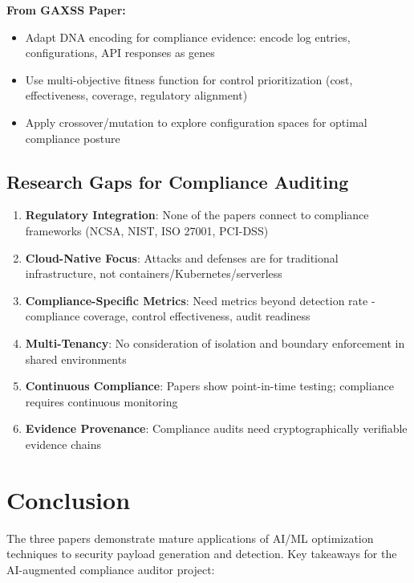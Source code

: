 \documentclass[11pt,conference]{IEEEtran}
\begin{document}
\begin{enumerate}
\textbf{From GAXSS Paper:}
\begin{itemize}
    \item Adapt DNA encoding for compliance evidence: encode log entries, configurations, API responses as genes
    \item Use multi-objective fitness function for control prioritization (cost, effectiveness, coverage, regulatory alignment)
    \item Apply crossover/mutation to explore configuration spaces for optimal compliance posture
\end{itemize}

\subsection{Research Gaps for Compliance Auditing}

\begin{enumerate}
    \item \textbf{Regulatory Integration}: None of the papers connect to compliance frameworks (NCSA, NIST, ISO 27001, PCI-DSS)
    \item \textbf{Cloud-Native Focus}: Attacks and defenses are for traditional infrastructure, not containers/Kubernetes/serverless
    \item \textbf{Compliance-Specific Metrics}: Need metrics beyond detection rate - compliance coverage, control effectiveness, audit readiness
    \item \textbf{Multi-Tenancy}: No consideration of isolation and boundary enforcement in shared environments
    \item \textbf{Continuous Compliance}: Papers show point-in-time testing; compliance requires continuous monitoring
    \item \textbf{Evidence Provenance}: Compliance audits need cryptographically verifiable evidence chains
\end{enumerate}

\section{Conclusion}

The three papers demonstrate mature applications of AI/ML optimization techniques to security payload generation and detection. Key takeaways for the AI-augmented compliance auditor project:


\end{enumerate}
\end{document}
